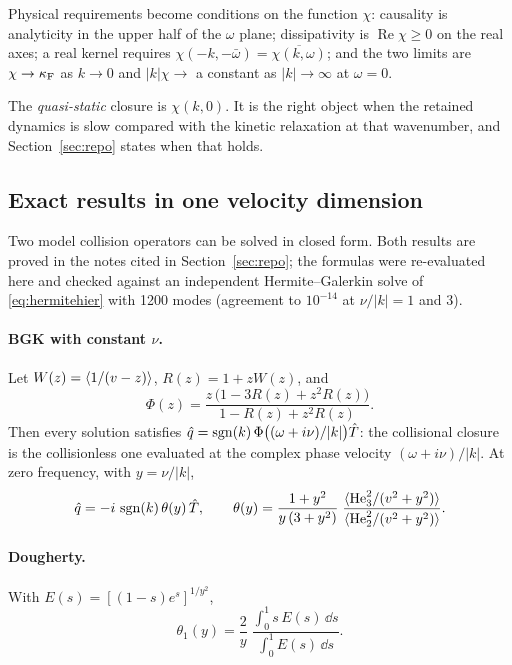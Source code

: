 Physical requirements become conditions on the function $\chi$:
causality is analyticity in the upper half of the $\omega$ plane;
dissipativity is $\operatorname{Re}\chi\ge0$ on the real axes; a real
kernel requires $\chi(-k,-\bar\omega)=\overline{\chi(k,\omega)}$; and the
two limits are $\chi\to\kappa_{\mathrm F}$ as $k\to0$ and $|k|\chi\to$ a constant as
$|k|\to\infty$ at $\omega=0$.

The \emph{quasi-static} closure is $\chi(k,0)$. It is the right object when
the retained dynamics is slow compared with the kinetic relaxation at that
wavenumber, and Section~\ref{sec:repo} states when that holds.

\subsection{Exact results in one velocity dimension}

Two model collision operators can be solved in closed form. Both results
are proved in the notes cited in Section~\ref{sec:repo}; the formulas were
re-evaluated here and checked against an independent Hermite--Galerkin
solve of \eqref{eq:hermitehier} with 1200 modes (agreement to
$10^{-14}$ at $\nu/|k|=1$ and $3$).

\paragraph{BGK with constant $\nu$.} Let $W(z)=\langle 1/(v-z) \rangle$,
$R(z)=1+zW(z)$, and
\[
  \Phi(z)=\frac{z\,\bigl(1-3R(z)+z^2R(z)\bigr)}{1-R(z)+z^2R(z)} .
\]
Then every solution satisfies
$\hat q=\operatorname{sgn}(k)\,\Phi\bigl((\omega+i\nu)/|k|\bigr)\hat T$: the collisional
closure is the collisionless one evaluated at the complex phase velocity
$(\omega+i\nu)/|k|$. At zero frequency, with $y=\nu/|k|$,
\begin{equation}
  \hat q=-i\,\operatorname{sgn}(k)\,\theta(y)\,\hat T,\qquad
  \theta(y)=\frac{1+y^2}{y\,(3+y^2)}\;
  \frac{\langle \mathrm{He}_3^2/(v^2+y^2) \rangle}{\langle \mathrm{He}_2^2/(v^2+y^2) \rangle} .
  \label{eq:theta-bgk}
\end{equation}

\paragraph{Dougherty.} With $E(s)=[(1-s)e^s]^{1/y^2}$,
\begin{equation}
  \theta_1(y)=\frac2y\;\frac{\int_0^1s\,E(s)\,\dd s}{\int_0^1E(s)\,\dd s}.
  \label{eq:theta-dougherty}
\end{equation}

